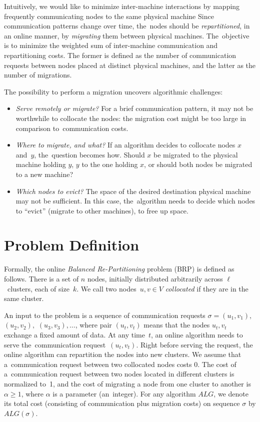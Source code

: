 \documentclass[manuscript,screen=true]{acmart}
\begin{document}
Intuitively, we would like to minimize inter-machine
interactions by mapping frequently communicating nodes to the same physical machine
Since communication patterns change over time, the~nodes should be \emph{repartitioned}, in
an online manner, by \emph{migrating} them between physical machines.
The~objective is to minimize the weighted sum of inter-machine communication and repartitioning costs.
The former is defined as the number of communication requests between nodes placed at distinct physical machines, and the latter as the number of migrations.


The possibility to perform a migration uncovers algorithmic challenges:
\begin{itemize}

\item \emph{Serve remotely or migrate?} For a brief communication
pattern, it may not be worthwhile to collocate the nodes: the migration cost might
be too large in comparison to~communication costs.

\item \emph{Where to migrate, and what?}
If an algorithm decides to collocate nodes $x$ and~$y$, the~question becomes
how. Should $x$ be migrated to the physical machine holding $y$, $y$ to the one holding
$x$, or should both nodes be migrated to a new machine?

\item \emph{Which nodes to evict?}
The space of the desired destination physical machine may not be sufficient. In
this case, the~algorithm needs to decide which nodes to ``evict'' (migrate to
other machines), to free up space.

\end{itemize}


\section{Problem Definition}
\label{sec:problem-definition}

Formally, the online \emph{Balanced Re-Partitioning} problem (BRP) is defined as
follows. There is a set of $n$ nodes, initially distributed arbitrarily
across $\ell$~clusters, each of size~$k$. We call two nodes~$u,v\in V$
\emph{collocated} if they are in the same cluster.

An input to the problem is a sequence of communication requests $\sigma =
(u_1,v_1),$ $(u_2,v_2),$ $(u_3,v_3), \ldots$, where pair $(u_t,v_t)$ means that
the nodes $u_t,v_t$ exchange a fixed amount of data.  At any time~$t$, an online algorithm needs to serve the~communication
request~$(u_t,v_t)$. Right before serving the request, the online algorithm
can repartition the nodes into new clusters. We assume that
a~communication request between two collocated nodes costs 0. The cost of a~communication request between two nodes located in different clusters is
normalized to~1, and the cost of migrating a node from one cluster to another
is~$\alpha \geq 1$, where $\alpha$ is a parameter (an~integer). For any
algorithm $ALG$, we denote its total cost (consisting of communication plus
migration costs) on sequence $\sigma$ by $ALG(\sigma)$.
\end{document}
